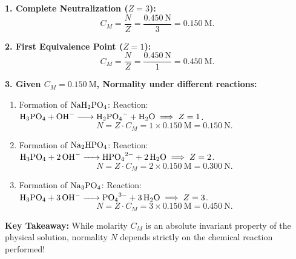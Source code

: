 \begin{tabletworkspace}[5.0cm]
\end{tabletworkspace}

\begin{solution}
\textbf{1. Complete Neutralization ($Z = 3$):}
\[
C_M = \frac{N}{Z} = \frac{0.450\ \mathrm{N}}{3} = \mathbf{0.150\ \mathrm{M}}.
\]

\textbf{2. First Equivalence Point ($Z = 1$):}
\[
C_M = \frac{N}{Z} = \frac{0.450\ \mathrm{N}}{1} = \mathbf{0.450\ \mathrm{M}}.
\]

\textbf{3. Given $C_M = 0.150\ \mathrm{M}$, Normality under different reactions:}
\begin{enumerate}[leftmargin=1.4em,itemsep=2pt]
  \item Formation of $\ce{NaH2PO4}$: Reaction: $\ce{H3PO4 + OH- -> H2PO4- + H2O} \implies Z = 1$.
  \[
  N = Z \cdot C_M = 1 \times 0.150\ \mathrm{M} = \mathbf{0.150\ \mathrm{N}}.
  \]
  \item Formation of $\ce{Na2HPO4}$: Reaction: $\ce{H3PO4 + 2 OH- -> HPO4^{2-} + 2 H2O} \implies Z = 2$.
  \[
  N = Z \cdot C_M = 2 \times 0.150\ \mathrm{M} = \mathbf{0.300\ \mathrm{N}}.
  \]
  \item Formation of $\ce{Na3PO4}$: Reaction: $\ce{H3PO4 + 3 OH- -> PO4^{3-} + 3 H2O} \implies Z = 3$.
  \[
  N = Z \cdot C_M = 3 \times 0.150\ \mathrm{M} = \mathbf{0.450\ \mathrm{N}}.
  \]
\end{enumerate}
\textbf{Key Takeaway:} While molarity $C_M$ is an absolute invariant property of the physical solution, normality $N$ depends strictly on the chemical reaction performed!
\end{solution}


